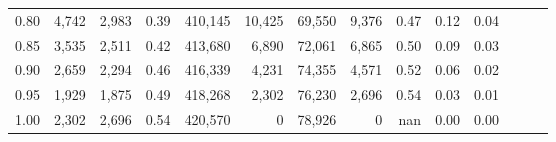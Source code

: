 \begin{tabular}{rrrrrrrrrrrrrr}
0.80 &   4,742 &  2,983 &  0.39 &  410,145 &   10,425 &  69,550 &   9,376 &  0.47 &  0.12 &      0.04 \\
0.85 &   3,535 &  2,511 &  0.42 &  413,680 &    6,890 &  72,061 &   6,865 &  0.50 &  0.09 &      0.03 \\
0.90 &   2,659 &  2,294 &  0.46 &  416,339 &    4,231 &  74,355 &   4,571 &  0.52 &  0.06 &      0.02 \\
0.95 &   1,929 &  1,875 &  0.49 &  418,268 &    2,302 &  76,230 &   2,696 &  0.54 &  0.03 &      0.01 \\
1.00 &   2,302 &  2,696 &  0.54 &  420,570 &        0 &  78,926 &       0 &   nan &  0.00 &      0.00 \\
\bottomrule
\end{tabular}

